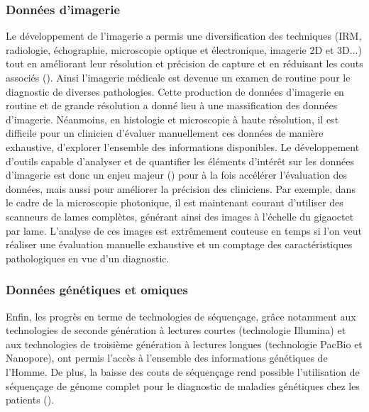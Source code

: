 \subsubsection{Données d'imagerie}
Le développement de l'imagerie a permis une diversification des techniques (IRM, radiologie, échographie, microscopie optique et électronique, imagerie 2D et 3D...) tout en améliorant leur résolution et précision de capture  et en réduisant les couts associés (\cite{abdallah_history_2017, prakash_super-resolution_2022, sheppard_structured_2021}). Ainsi l'imagerie médicale est devenue un examen de routine pour le diagnostic de diverses pathologies. Cette production de données d'imagerie en routine et de grande résolution a donné lieu à une massification des données d'imagerie. Néanmoins, en histologie et microscopie à haute résolution, il est difficile pour un clinicien d'évaluer manuellement ces données de manière exhaustive, d'explorer l'ensemble des informations disponibles. Le développement d'outils capable d'analyser et de quantifier les éléments d'intérêt sur les données d'imagerie est donc un enjeu majeur (\cite{tchito_tchapga_biomedical_2021}) pour à la fois accélérer l'évaluation des données, mais aussi pour améliorer la précision des cliniciens. Par exemple, dans le cadre de la microscopie photonique, il est maintenant courant d'utiliser des scanneurs de lames complètes, générant ainsi des images à l'échelle du gigaoctet par lame. L'analyse de ces images est extrêmement couteuse en temps si l’on veut réaliser une évaluation manuelle exhaustive et un comptage des caractéristiques pathologiques en vue d'un diagnostic.

\subsubsection{Données génétiques et omiques}
Enfin, les progrès en terme de technologies de séquençage, grâce notamment aux technologies de seconde génération à lectures courtes (technologie Illumina) et aux technologies de troisième génération à lectures longues (technologie PacBio et Nanopore), ont permis l'accès à l'ensemble des informations génétiques de l'Homme. De plus, la baisse des couts de séquençage rend possible l'utilisation de séquençage de génome complet pour le diagnostic de maladies génétiques chez les patients (\cite{rabbani_next-generation_2012}). 

